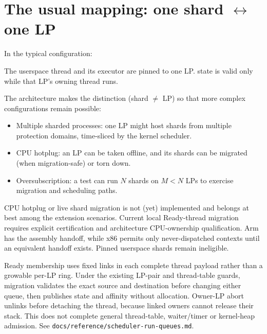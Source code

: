 \section[The usual mapping: one shard per LP]{The usual mapping: one shard $\leftrightarrow$ one LP}

In the typical configuration:

\begin{center}
\end{center}

The userspace thread and its executor are pinned to one LP.
 state is valid only while that LP's owning thread runs.

The architecture makes the distinction (shard $\neq$ LP) so that more complex
configurations remain possible:

\begin{itemize}
    \item Multiple sharded processes: one LP might host shards from
        multiple protection domains, time-sliced by the kernel scheduler.
    \item CPU hotplug: an LP can be taken offline, and its shards can be
        migrated (when migration-safe) or torn down.
    \item Oversubscription: a test can run $N$ shards on $M < N$ LPs
        to exercise migration and scheduling paths.
\end{itemize}

CPU hotplug or live shard migration is not (yet) implemented and belongs at
best among the extension scenarios. Current local Ready-thread migration requires
explicit certification and architecture CPU-ownership qualification. Arm has
the assembly handoff, while x86 permits only never-dispatched contexts until an
equivalent handoff exists. Pinned userspace shards remain ineligible.

Ready membership uses fixed links in each complete thread payload rather than
a growable per-LP ring. Under the existing LP-pair and thread-table guards,
migration validates the exact source and destination before changing either
queue, then publishes state and affinity without allocation. Owner-LP abort
unlinks before detaching the thread, because linked owners cannot release their stack.
This does not complete general thread-table, waiter/timer or kernel-heap
admission. See \texttt{docs/reference/scheduler-run-queues.md}.

